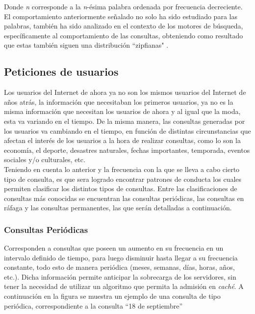\documentclass[12pt]{ociamthesis}  %
\begin{document}
Donde \textit{n} corresponde a la \textit{n}-ésima palabra ordenada por frecuencia decreciente. El comportamiento anteriormente señalado no solo ha sido estudiado para las palabras, también ha sido analizado en el contexto de los motores de búsqueda, específicamente al comportamiento de las consultas, obteniendo como resultado que estas también siguen una distribución ``zipfianas" \cite{baeza2012modeling}\cite{cambazoglu2010refreshing}\cite{gan2009improved}\cite{lempel2003predictive}\cite{wang2013impact}\cite{saraiva2001rank}\cite{xie2002locality}.



\subsection{Peticiones de usuarios}
Los usuarios del Internet de ahora ya no son los mismos usuarios del Internet de años atrás, la información que necesitaban los primeros usuarios, ya no es la misma información que necesitan los usuarios de ahora y al igual que la moda, esta va variando en el tiempo. De la misma manera, las consultas generadas por los usuarios va cambiando en el tiempo, en función de distintas circunstancias que afectan el interés de los usuarios a la hora de realizar consultas, como lo son la economía, el deporte, desastres naturales, fechas importantes, temporada, eventos sociales y/o culturales, etc.\\

Teniendo en cuenta lo anterior y la frecuencia con la que se lleva a cabo cierto tipo de consulta, es que sera logrado encontrar patrones de conducta los cuales permiten clasificar los distintos tipos de consultas. Entre las clasificaciones de consultas más conocidas se encuentran las consultas periódicas, las consultas en ráfaga y las consultas permanentes, las que serán detalladas a continuación.

\subsubsection{Consultas Periódicas}
Corresponden a consultas que poseen un aumento en su frecuencia en un intervalo definido de tiempo, para luego disminuir hasta llegar a su frecuencia constante, todo esto de manera periódica (meses, semanas, días, horas, años, etc.). Dicha información permite anticipar la sobrecarga de los servidores, sin tener la necesidad de utilizar un algoritmo que permita la admisión en \textit{caché}. A continuación en la figura se muestra un ejemplo de una consulta de tipo periódica, correspondiente a la consulta ``18 de septiembre''\\
\end{document}
